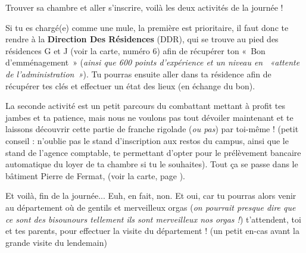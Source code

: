 Trouver sa chambre et aller s'inscrire, voilà les deux activités de la journée !

\vspace{1em}

Si tu es chargé(e) comme une mule, la première est prioritaire, il faut donc te
rendre à la \textbf{Direction Des Résidences} (DDR), qui se trouve au pied des résidences
G et J (voir la carte, numéro 6) afin de récupérer ton «~Bon d'emménagement~» (\emph{ainsi que 600 points
d'expérience et un niveau en ~«attente de l'administration~»}).
Tu pourras ensuite aller dans ta résidence afin de récupérer tes
clés et effectuer un état des lieux (en échange du bon).

\vspace{1em}

La seconde activité est un petit parcours du combattant mettant à profit tes 
jambes et ta patience, mais nous ne voulons pas tout dévoiler maintenant et
te laissons découvrir cette partie de franche rigolade (\emph{ou pas}) par toi-même !
(petit conseil : n'oublie pas le stand d'inscription aux restos du campus, ainsi que le
 stand de l'agence comptable, te permettant d'opter pour le prélèvement bancaire
 automatique du loyer de ta chambre si tu le souhaites). Tout ça se passe dans le 
 bâtiment Pierre de Fermat, (voir la carte, page \pageref{plan}).

 \vspace{1em}
 
Et voilà, fin de la journée... Euh, en fait, non.
Et oui, car tu pourras alors venir au département où de gentils et merveilleux
orgas (\emph{on pourrait presque dire que ce sont des bisounours tellement ils sont
merveilleux nos orgas !}) t'attendent, toi et tes parents, pour effectuer
la visite du département ! (un petit en-cas avant la grande visite du lendemain) 
